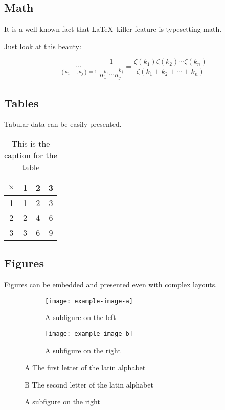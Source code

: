 \documentclass{metanorma}
\begin{document}
\subsection{Math}

It is a well known fact that \LaTeX\ killer feature is typesetting math.

Just look at this beauty:

\begin{equation*}
  \mathop{\sum_{n_1=1}^\infty\cdots\sum_{n_j=1}^\infty}\limits_{(n_1,\dots,n_j)=1} \frac1{n_1^{k_1} \cdots n_j^{k_j}}=\frac{\zeta(k_1)\zeta(k_2)\cdots \zeta(k_n) }{\zeta(k_1+k_2+\cdots+k_n)}
\end{equation*}

\subsection{Tables}

Tabular data can be easily presented.

\begin{table}[h]\centering
  \label{tab:example}
  \caption{This is the caption for the table}
  \begin{tabular}{c|ccc}
    $\times$ & 1 & 2 & 3 \\\hline
    1 & 1 & 2 & 3 \\
    2 & 2 & 4 & 6 \\
    3 & 3 & 6 & 9 \\
  \end{tabular}
\end{table}

\subsection{Figures}

Figures can be embedded and presented even with complex layouts.

\begin{figure}[h]\centering
  \label{fig:whole}
  \caption{A figure with two subfigures}
  \begin{subfigure}[b]{0.4\textwidth}
    \texttt{[image: example-image-a]}
    \caption{A subfigure on the left}
    \label{fig:left}
  \end{subfigure}
  \qquad
  \begin{subfigure}[b]{0.4\textwidth}
    \texttt{[image: example-image-b]}
    \caption{A subfigure on the right}
    \label{fig:right}
  \end{subfigure}
  \begin{key}
    \item[A] The first letter of the latin alphabet
    \item[B] The second letter of the latin alphabet
  \end{key}
\end{figure}
\end{document}
